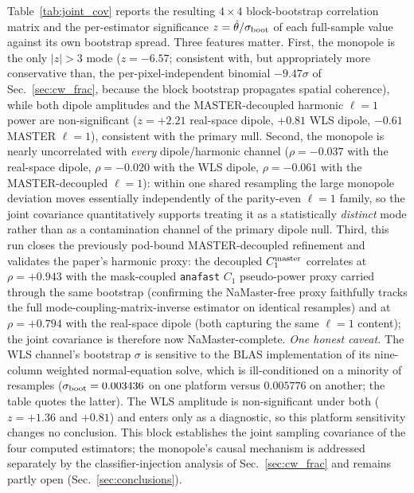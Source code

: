 \documentclass[twocolumn,linenumbers]{aastex702}
\newcommand{\sigmaunit}{\sigma}
\begin{document}
Table~\ref{tab:joint_cov} reports the resulting $4\times4$ block-bootstrap correlation matrix and the per-estimator significance $z=\hat\theta/\sigma_{\rm boot}$ of each full-sample value against its own bootstrap spread. Three features matter. First, the monopole is the only $|z|>3$ mode ($z=-6.57$; consistent with, but appropriately more conservative than, the per-pixel-independent binomial $-9.47\sigmaunit$ of Sec.~\ref{sec:cw_frac}, because the block bootstrap propagates spatial coherence), while both dipole amplitudes and the MASTER-decoupled harmonic $\ell=1$ power are non-significant ($z=+2.21$ real-space dipole, $+0.81$ WLS dipole, $-0.61$ MASTER $\ell=1$), consistent with the primary null. Second, the monopole is nearly uncorrelated with \emph{every} dipole/harmonic channel ($\rho=-0.037$ with the real-space dipole, $\rho=-0.020$ with the WLS dipole, $\rho=-0.061$ with the MASTER-decoupled $\ell=1$): within one shared resampling the large monopole deviation moves essentially independently of the parity-even $\ell=1$ family, so the joint covariance quantitatively supports treating it as a statistically \emph{distinct} mode rather than as a contamination channel of the primary dipole null. Third, this run closes the previously pod-bound MASTER-decoupled refinement and validates the paper's harmonic proxy: the decoupled $C_1^{\rm master}$ correlates at $\rho=+0.943$ with the mask-coupled \texttt{anafast} $C_1$ pseudo-power proxy carried through the same bootstrap (confirming the NaMaster-free proxy faithfully tracks the full mode-coupling-matrix-inverse estimator on identical resamples) and at $\rho=+0.794$ with the real-space dipole (both capturing the same $\ell=1$ content); the joint covariance is therefore now NaMaster-complete. \emph{One honest caveat.} The WLS channel's bootstrap $\sigma$ is sensitive to the BLAS implementation of its nine-column weighted normal-equation solve, which is ill-conditioned on a minority of resamples ($\sigma_{\rm boot}=0.003436$ on one platform versus $0.005776$ on another; the table quotes the latter). The WLS amplitude is non-significant under both ($z=+1.36$ and $+0.81$) and enters only as a diagnostic, so this platform sensitivity changes no conclusion. This block establishes the joint sampling covariance of the four computed estimators; the monopole's causal mechanism is addressed separately by the classifier-injection analysis of Sec.~\ref{sec:cw_frac} and remains partly open (Sec.~\ref{sec:conclusions}).
\end{document}
